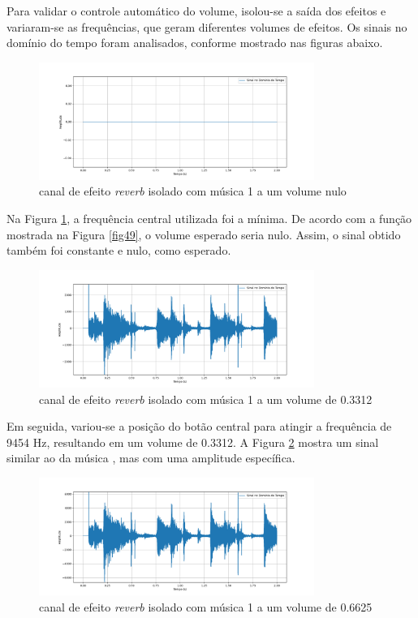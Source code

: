 Para validar o controle automático do volume, isolou-se a saída dos efeitos e variaram-se as frequências, que geram diferentes volumes de efeitos. Os sinais no domínio do tempo foram analisados, conforme mostrado nas figuras abaixo.

\begin{figure}[h]
    \centering
    \includegraphics[width=0.8\textwidth]{figuras/fig66.png}
    \caption{canal de efeito \textit{reverb} isolado com música 1 a um volume nulo}
    \label{fig66}
\end{figure}

Na Figura \ref{fig66}, a frequência central utilizada foi a mínima. De acordo com a função mostrada na Figura \ref{fig49}, o volume esperado seria nulo. Assim, o sinal obtido também foi constante e nulo, como esperado.

\begin{figure}[h]
    \centering
    \includegraphics[width=0.8\textwidth]{figuras/fig67.png}
    \caption{canal de efeito \textit{reverb} isolado com música 1 a um volume de 0.3312}
    \label{fig67}
\end{figure}

Em seguida, variou-se a posição do botão central para atingir a frequência de 9454 Hz, resultando em um volume de 0.3312. A Figura \ref{fig67} mostra um sinal similar ao da música \cite{track01}, mas com uma amplitude específica.

\newpage

\begin{figure}[h]
    \centering
    \includegraphics[width=0.8\textwidth]{figuras/fig68.png}
    \caption{canal de efeito \textit{reverb} isolado com música 1 a um volume de 0.6625}
    \label{fig68}
\end{figure}

